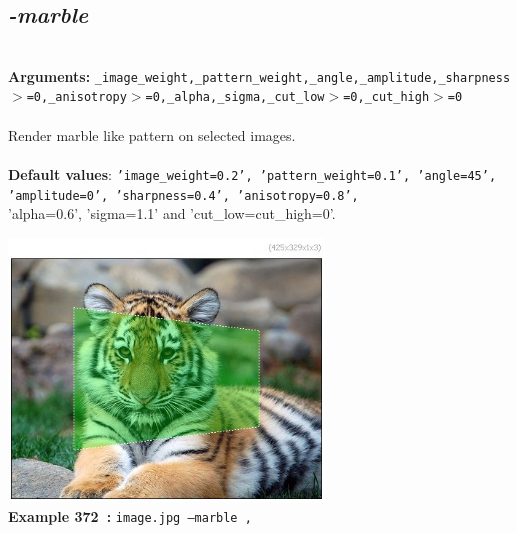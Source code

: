 \documentclass[a4paper,11pt,twoside]{book}
\begin{document}
\subsection{\emph{-marble} }\vspace*{-0.5em}
~\\\textbf{Arguments: } 
{\small \texttt{\_image\_weight,\_pattern\_weight,\_angle,\_amplitude,\_sharpness$>$=0,\_anisotropy$>$=0,\_alpha,\_sigma,\_cut\_low$>$=0,\_cut\_high$>$=0}}\\~\\
Render marble like pattern on selected images.
~\\~\\\textbf{Default values}: {\small \texttt{'image\_weight=0.2', 'pattern\_weight=0.1', 'angle=45', 'amplitude=0', 'sharpness=0.4', 'anisotropy=0.8',}}
~\\'alpha=0.6', 'sigma=1.1' and 'cut\_low=cut\_high=0'.
\begin{center}\includegraphics[keepaspectratio=true,height=7cm,width=\textwidth]{img/gmic_def372.jpg}\\
{\footnotesize \textbf{Example 372~:} \texttt{image.jpg --marble ,}}
\end{center}
\end{document}
